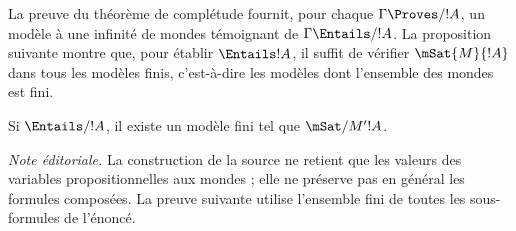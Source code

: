 \documentclass[../../../include/open-logic-section]{subfiles}
\begin{document}


La preuve du théorème de complétude fournit, pour chaque
$\Gamma \Proves/ !A$, un modèle à une infinité de mondes témoignant
de $\Gamma \Entails/ !A$. La proposition suivante montre que, pour
établir $\Entails !A$, il suffit de vérifier
$\mSat{M}{!A}$ dans tous les modèles finis, c'est-à-dire les modèles
dont l'ensemble des mondes est fini.

\begin{thm}
  Si $\Entails/ !A$, il existe un modèle fini tel que
  $\mSat/{M'}{!A}$.
\end{thm}

\emph{Note éditoriale.} La construction de la source ne retient que
les valeurs des variables propositionnelles aux mondes ; elle ne
préserve pas en général les formules composées. La preuve suivante
utilise l'ensemble fini de toutes les sous-formules de l'énoncé.
\end{document}
